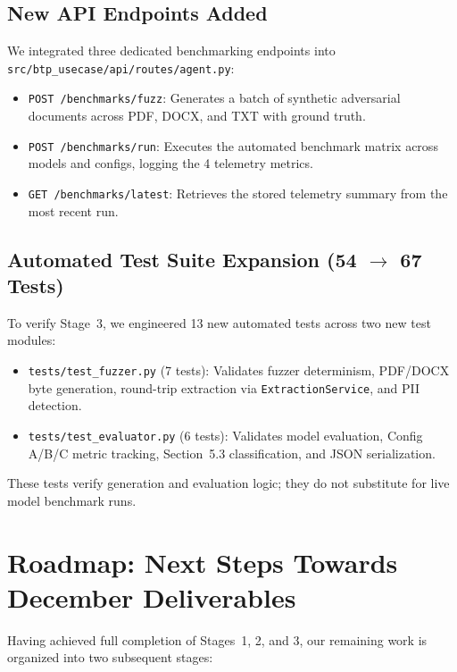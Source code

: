 \documentclass[10pt,a4paper]{article}
\begin{document}
\subsection{New API Endpoints Added}
We integrated three dedicated benchmarking endpoints into \texttt{src/btp\_usecase/api/routes/agent.py}:
\begin{itemize}
    \item \texttt{POST /benchmarks/fuzz}: Generates a batch of synthetic adversarial documents across PDF, DOCX, and TXT with ground truth.
    \item \texttt{POST /benchmarks/run}: Executes the automated benchmark matrix across models and configs, logging the 4 telemetry metrics.
    \item \texttt{GET /benchmarks/latest}: Retrieves the stored telemetry summary from the most recent run.
\end{itemize}

\subsection{Automated Test Suite Expansion (54 $\to$ 67 Tests)}
To verify Stage~3, we engineered 13 new automated tests across two new test modules:
\begin{itemize}
    \item \texttt{tests/test\_fuzzer.py} (7 tests): Validates fuzzer determinism, PDF/DOCX byte generation, round-trip extraction via \texttt{ExtractionService}, and PII detection.
    \item \texttt{tests/test\_evaluator.py} (6 tests): Validates model evaluation, Config A/B/C metric tracking, Section~5.3 classification, and JSON serialization.
\end{itemize}
These tests verify generation and evaluation logic; they do not substitute for live model benchmark runs.

\section{Roadmap: Next Steps Towards December Deliverables}

Having achieved full completion of Stages~1, 2, and 3, our remaining work is organized into two subsequent stages:
\end{document}
